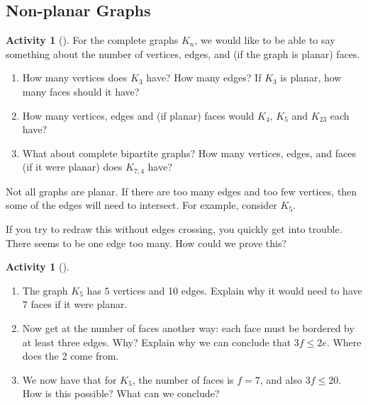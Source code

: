 \documentclass[10pt,]{book}
\theoremstyle{plain}
\theoremstyle{definition}
\theoremstyle{definition}
\theoremstyle{definition}
\newtheorem{activity}[project]{Activity}
\numberwithin{equation}{chapter}
\newcommand{\vtx}[2]{node[fill,circle,inner sep=0pt, minimum size=4pt,label=#1:#2]{}}
\renewcommand{\v}{\vtx{above}{}}
\begin{document}
\subsection[{Non-planar Graphs}]{Non-planar Graphs}\label{subsection-7}
\begin{activity}[]\label{activity-21}
\hypertarget{p-264}{}%
For the complete graphs \(K_n\), we would like to be able to say something about the number of vertices, edges, and (if the graph is planar) faces.%
\begin{enumerate}[font=\bfseries,label=(\alph*),ref=\alph*]
\item\label{task-33} \hypertarget{p-265}{}%
How many vertices does \(K_3\) have? How many edges?  If \(K_3\) is planar, how many faces should it have?%
\item\label{task-34} \hypertarget{p-266}{}%
How many vertices, edges and (if planar) faces would \(K_4\), \(K_5\) and \(K_{23}\) each have?%
\item\label{task-35} \hypertarget{p-267}{}%
What about complete bipartite graphs? How many vertices, edges, and faces (if it were planar) does \(K_{7,4}\) have?%
\end{enumerate}
\end{activity}
\hypertarget{p-268}{}%
Not all graphs are planar. If there are too many edges and too few vertices, then some of the edges will need to intersect. For example, consider \(K_5\).%
\begin{sidebyside}{1}{0.4}{0.4}{0}
\begin{sbspanel}{0.2}
\resizebox{\linewidth}{!}{{
\begin{tikzpicture}
          \foreach \x in {0,...,4}
          \draw (\x*72+18:1) \v -- (\x*72+90:1) -- (\x*72-54:1);
        \end{tikzpicture}
}
}
\end{sbspanel}
\end{sidebyside}
\par
\hypertarget{p-269}{}%
If you try to redraw this without edges crossing, you quickly get into trouble. There seems to be one edge too many. How could we prove this?%
\begin{activity}[]\label{activity-22}
\leavevmode%
\begin{enumerate}[font=\bfseries,label=(\alph*),ref=\alph*]
\item\label{task-36} \hypertarget{p-270}{}%
The graph \(K_5\) has \(5\) vertices and 10 edges.  Explain why it would need to have \(7\) faces if it were planar.%
\item\label{task-37} \hypertarget{p-272}{}%
Now get at the number of faces another way: each face must be bordered by at least three edges.  Why?  Explain why we can conclude that \(3f \le 2e\).  Where does the 2 come from.%
\item\label{task-38} \hypertarget{p-274}{}%
We now have that for \(K_5\), the number of faces is \(f = 7\), and also \(3f \le 20\).  How is this possible?  What can we conclude?%
\end{enumerate}
\end{activity}
\end{document}
